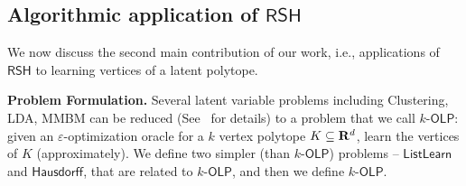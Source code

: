 \documentclass[11pt,letterpaper]{article}
\newcommand{\rsh}{{\mathsf {RSH}}\xspace}
\newcommand{\olp}{{\mathsf {OLP}}\xspace}
\newcommand{\kolp}{k\mbox{-}\olp}
\newcommand{\ListLearn}{\mathsf {ListLearn}\xspace}
\newcommand{\Hausdorf}{\mathsf {Hausdorff}\xspace }
\begin{document}





\subsection{Algorithmic application of $\rsh$}\label{algorithmic-rsh}
We now discuss the second main contribution of our work, i.e., applications of $\rsh$ to learning vertices of a latent polytope.

\vspace*{0.1 in}
\noindent
{\bf Problem Formulation.}
Several latent variable problems including Clustering, LDA, MMBM can be reduced 
(See~ for details) to a problem that we call $\kolp$: given an $\varepsilon$-optimization oracle for a $k$ vertex polytope $K\subseteq {\bf R}^d$, learn the vertices of $K$ (approximately). 
We define two simpler (than $\kolp$) problems -- $\ListLearn$ and $\Hausdorf$, that are related to $\kolp$, and then we define $\kolp$. 

\end{document}
